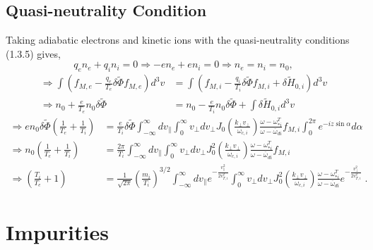 \documentclass[12pt]{article}
\numberwithin{equation}{subsection}
\begin{document}
\subsection{Quasi-neutrality Condition}
   \quad Taking adiabatic electrons and kinetic ions with the quasi-neutrality conditions (1.3.5) gives,
   \begin{equation}
      q_e n_e + q_i n_i = 0 \Rightarrow -e n_e + e n_i = 0 \Rightarrow n_e = n_i = n_0,
   \end{equation}
   \begin{equation}
   \begin{aligned}
      \Rightarrow \int(f_{M,e}-\frac{q_e}{T_e}\delta\widetilde{\Phi}f_{M,e})d^3v
                 &= \int(f_{M,i} - \frac{q_i}{T_i}\delta\widetilde{\Phi}f_{M,i} + \delta\widetilde{H}_{0,i})d^3v \\
      \Rightarrow n_0 + \frac{e}{T_e}n_0\delta\widetilde{\Phi}
                 &= n_0 - \frac{e}{T_i}n_0\delta\widetilde{\Phi} + \int\delta\widetilde{H}_{0,i}d^3v
   \end{aligned}
   \end{equation}
   \begin{equation}
   \begin{aligned}
      \Rightarrow  en_0\delta\widetilde{\Phi}(\frac{1}{T_e} + \frac{1}{T_i})
                &= \frac{e}{T_i}\delta\widetilde{\Phi}\int_{-\infty}^{\infty}dv_\parallel\int_{0}^{\infty}v_\perp dv_\perp
                   J_0(\frac{k_\perp v_\perp}{\omega_{c,i}})\frac{\omega - \omega_{*i}^T}{\omega - \bar{\omega}_{di}}f_{M,i}\int_{0}^{2\pi}e^{-iz\sin\alpha}d\alpha \\
      \Rightarrow n_0(\frac{1}{T_e} + \frac{1}{T_i}) &= \frac{2\pi}{T_i}\int_{-\infty}^{\infty}dv_\parallel\int_{0}^{\infty}v_\perp dv_\perp
                  J_0^2(\frac{k_\perp v_\perp}{\omega_{c,i}})\frac{\omega - \omega_{*i}^T}{\omega - \bar{\omega}_{di}}f_{M,i} \\
      \Rightarrow (\frac{T_i}{T_e} + 1) &= \frac{1}{\sqrt{2\pi}}\left(\frac{m_i}{T_i}\right)^{3/2}\int_{-\infty}^{\infty}dv_\parallel e^{-\frac{v_\parallel^2}{2v^2_{T,i}}}
                  \int_{0}^{\infty}v_\perp dv_\perp J_0^2(\frac{k_\perp v_\perp}{\omega_{c,i}})\frac{\omega - \omega_{*i}^T}{\omega - \bar{\omega}_{di}}e^{-\frac{v_\perp^2}{2v^2_{T,i}}}\;.
   \end{aligned}
   \end{equation}


\section{Impurities}
\end{document}
